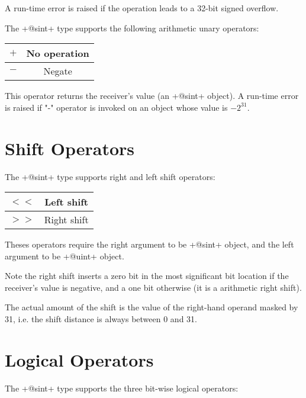 A run-time error is raised if the operation leads to a 32-bit signed overflow.

The \ggs+@sint+ type supports the following arithmetic unary operators:\newline

\begin{tabular}{|c|c|}
\hline
$+$ & No operation \\
\hline
$-$ & Negate \\
\hline
\end{tabular}

This operator returns the receiver's value (an \ggs+@sint+ object). A run-time error is raised if "-" operator is invoked on an object whose value is $-2^{31}$.






\section{Shift Operators}


The \ggs+@sint+ type supports right and left shift operators:\newline

\begin{tabular}{|c|c|}
\hline
$<<$ & Left shift \\
\hline
$>>$ & Right shift \\
\hline
\end{tabular}

Theses operators require the right argument to be \ggs+@sint+ object, and the left argument to be \ggs+@uint+ object.\newline

Note the right shift inserts a zero bit in the most significant bit location if the receiver's value is negative, and a one bit otherwise (it is a arithmetic right shift).\newline

The actual amount of the shift is the value of the right-hand operand masked by 31, i.e. the shift distance is always between 0 and 31.




\section{Logical Operators}

The \ggs+@sint+ type supports the three bit-wise logical operators:\newline

